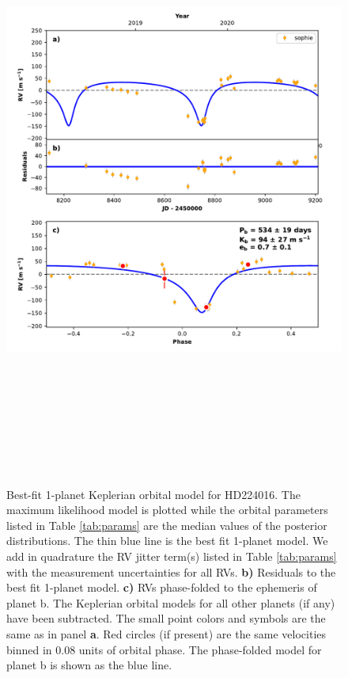 \documentclass{emulateapj}
\begin{document}
\begin{figure}[!h]
\centering 

\includegraphics[height=8.0in,width=6.0in,keepaspectratio]{hd224016_rv_multipanel.pdf}
\caption{ Best-fit 1-planet Keplerian orbital model
  for HD224016. The maximum likelihood model is plotted while
  the orbital parameters listed in Table \ref{tab:params} are the
  median values of the posterior distributions.  The thin blue line is
  the best fit 1-planet model. We add in quadrature
  the RV jitter term(s) listed in Table \ref{tab:params} with the
  measurement uncertainties for all RVs.  {\bf b)} Residuals to the
  best fit 1-planet model. {\bf c)} RVs phase-folded
  to the ephemeris of planet b. The Keplerian orbital models for all
  other planets (if any) have been subtracted.  The small point colors
  and symbols are the same as in panel {\bf a}.  Red circles (if
  present) are the same velocities binned in 0.08 units of orbital
  phase.  The phase-folded model for planet b is shown as the blue
  line.}
\end{figure}
 
\end{document}
